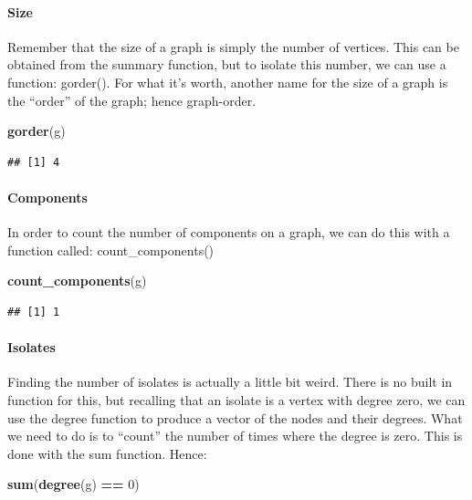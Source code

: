 \documentclass[
]{article}
\newenvironment{Shaded}{\begin{snugshade}}{\end{snugshade}}
\newcommand{\DecValTok}[1]{\textcolor[rgb]{0.00,0.00,0.81}{#1}}
\newcommand{\FunctionTok}[1]{\textcolor[rgb]{0.13,0.29,0.53}{\textbf{#1}}}
\newcommand{\NormalTok}[1]{#1}
\newcommand{\SpecialCharTok}[1]{\textcolor[rgb]{0.81,0.36,0.00}{\textbf{#1}}}
\begin{document}
\paragraph{Size}\label{size}

Remember that the size of a graph is simply the number of vertices. This
can be obtained from the summary function, but to isolate this number,
we can use a function: gorder(). For what it's worth, another name for
the size of a graph is the ``order'' of the graph; hence graph-order.

\begin{Shaded}
\begin{Highlighting}[]
\FunctionTok{gorder}\NormalTok{(g)}
\end{Highlighting}
\end{Shaded}

\begin{verbatim}
## [1] 4
\end{verbatim}

\paragraph{Components}\label{components}

In order to count the number of components on a graph, we can do this
with a function called: count\_components()

\begin{Shaded}
\begin{Highlighting}[]
\FunctionTok{count\_components}\NormalTok{(g)}
\end{Highlighting}
\end{Shaded}

\begin{verbatim}
## [1] 1
\end{verbatim}

\paragraph{Isolates}\label{isolates}

Finding the number of isolates is actually a little bit weird. There is
no built in function for this, but recalling that an isolate is a vertex
with degree zero, we can use the degree function to produce a vector of
the nodes and their degrees. What we need to do is to ``count'' the
number of times where the degree is zero. This is done with the sum
function. Hence:

\begin{Shaded}
\begin{Highlighting}[]
\FunctionTok{sum}\NormalTok{(}\FunctionTok{degree}\NormalTok{(g) }\SpecialCharTok{==} \DecValTok{0}\NormalTok{)}
\end{Highlighting}
\end{Shaded}
\end{document}
